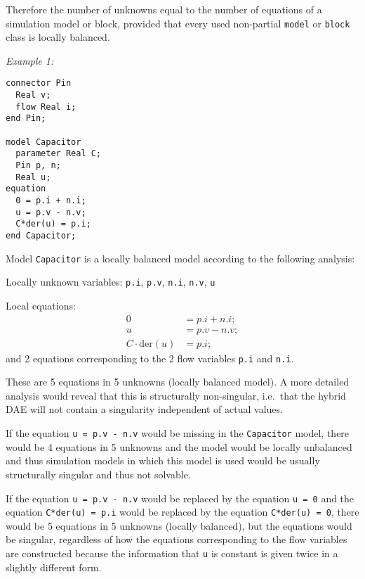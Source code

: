 \begin{nonnormative}
Therefore the number of unknowns equal to the number of equations of a simulation model or block, provided that every used non-partial \lstinline!model! or \lstinline!block! class is locally balanced.
\end{nonnormative}

\begin{example}
\emph{Example 1:}
\begin{lstlisting}[language=modelica]
connector Pin
  Real v;
  flow Real i;
end Pin;

model Capacitor
  parameter Real C;
  Pin p, n;
  Real u;
equation
  0 = p.i + n.i;
  u = p.v - n.v;
  C*der(u) = p.i;
end Capacitor;
\end{lstlisting}

Model \lstinline!Capacitor! is a locally balanced model according to the following analysis:

Locally unknown variables: \lstinline!p.i!, \lstinline!p.v!, \lstinline!n.i!, \lstinline!n.v!, \lstinline!u!

Local equations:
\begin{align*}
0 &= p.i + n.i;\\
u &= p.v - n.v;\\
C \cdot \text{der}(u) &= p.i;
\end{align*}
and 2 equations corresponding to the 2 flow variables \lstinline!p.i! and \lstinline!n.i!.

These are 5 equations in 5 unknowns (locally balanced model).  A more detailed analysis would reveal that this is structurally non-singular, i.e.\ that
the hybrid DAE will not contain a singularity independent of actual values.

If the equation \lstinline!u = p.v - n.v! would be missing in the \lstinline!Capacitor! model, there would be 4 equations in 5 unknowns and the model
would be locally unbalanced and thus simulation models in which this model is used would be usually structurally singular and thus not solvable.

If the equation \lstinline!u = p.v - n.v! would be replaced by the equation \lstinline!u = 0! and the equation \lstinline!C*der(u) = p.i! would be
replaced by the equation \lstinline!C*der(u) = 0!, there would be 5 equations in 5 unknowns (locally balanced), but the equations would be singular,
regardless of how the equations corresponding to the flow variables are constructed because the information that \lstinline!u! is constant is given twice
in a slightly different form.
\end{example}


